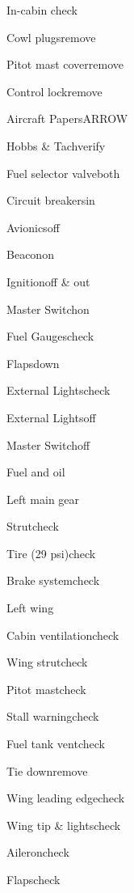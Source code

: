  




\begin{multicols}{2}
\begin{checklist}{In-cabin check}
  \item{Cowl plugs}{remove}
  \item{Pitot mast cover}{remove}
  \item{Control lock}{remove}
  \item{Aircraft Papers}{ARROW}
  \item{Hobbs \& Tach}{verify}
  \item{Fuel selector valve}{both}
  \item{Circuit breakers}{in}
  \item{Avionics}{off}
  \item{Beacon}{on}
  \item{Ignition}{off \& out}
  \item{Master Switch}{on}
  \item{Fuel Gauges}{check}
  \item{Flaps}{down}
  \item{External Lights}{check}
  \item{External Lights}{off}
  \item{Master Switch}{off}
\end{checklist}

\begin{checklist}{Fuel and oil}
\end{checklist}

\begin{checklist}{Left main gear}
  \item{Strut}{check}
  \item{Tire (29 psi)}{check}
  \item{Brake system}{check}
\end{checklist}

\begin{checklist}{Left wing}
  \item{Cabin ventilation}{check}
  \item{Wing strut}{check}
  \item{Pitot mast}{check}
  \item{Stall warning}{check}
  \item{Fuel tank vent}{check}
  \item{Tie down}{remove}
  \item{Wing leading edge}{check}
  \item{Wing tip \& lights}{check}
  \item{Aileron}{check}
  \item{Flaps}{check}
\end{checklist}


\end{multicols}
